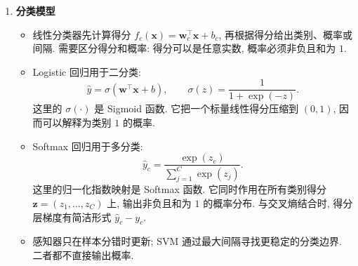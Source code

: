 \documentclass{../nndlcourse}
\begin{document}
\begin{enumerate}
    \item \textbf{分类模型}
    \begin{itemize}
        \item 线性分类器先计算得分 $f_c(\boldsymbol{x})=\boldsymbol{w}_c^\top\boldsymbol{x}+b_c$, 再根据得分给出类别、概率或间隔. 需要区分得分和概率: 得分可以是任意实数, 概率必须非负且和为 $1$.
        \item Logistic 回归用于二分类:
        \[
            \hat{y}=\sigma(\boldsymbol{w}^{\top}\boldsymbol{x}+b),
            \qquad
            \sigma(z)=\frac{1}{1+\exp(-z)}.
        \]
        这里的 $\sigma(\cdot)$ 是 Sigmoid 函数. 它把一个标量线性得分压缩到 $(0,1)$, 因而可以解释为类别 $1$ 的概率.
        \item Softmax 回归用于多分类:
        \[
            \hat{y}_c
            =
            \frac{\exp(z_c)}{\sum_{j=1}^{C}\exp(z_j)}.
        \]
        这里的归一化指数映射是 Softmax 函数. 它同时作用在所有类别得分 $\boldsymbol{z}=(z_1,\ldots,z_C)$ 上, 输出非负且和为 $1$ 的概率分布. 与交叉熵结合时, 得分层梯度有简洁形式 $\hat{y}_c-y_c$.
        \item 感知器只在样本分错时更新; SVM 通过最大间隔寻找更稳定的分类边界. 二者都不直接输出概率.
    \end{itemize}


\end{enumerate}
\end{document}
